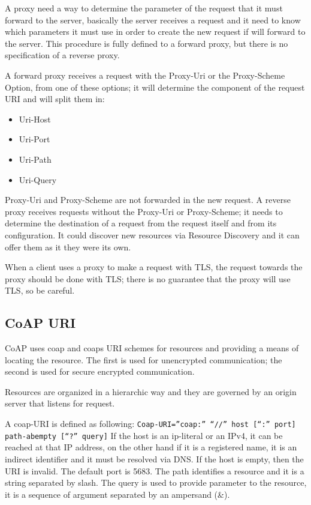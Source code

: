 	A proxy need a way to determine the parameter of the request that it must forward to the server, basically the server receives a request and it need to know which parameters it must use in order to create the new request if will forward to the server.
	This procedure is fully defined to a forward proxy, but there is no specification of a reverse proxy.
	
	A forward proxy receives a request with the Proxy-Uri or the Proxy-Scheme Option, from one of these options; it will determine the component of the request URI and will split them in:
	\begin{itemize}
		\item Uri-Host
		\item Uri-Port
		\item Uri-Path
		\item Uri-Query
	\end{itemize}

	Proxy-Uri and Proxy-Scheme are not forwarded in the new request.\newline
	A reverse proxy receives requests without the Proxy-Uri or Proxy-Scheme; it needs to determine the destination of a request from the request itself and from its configuration.
	It could discover new resources via Resource Discovery and it can offer them as it they were its own.
	
	When a client uses a proxy to make a request with TLS, the request towards the proxy should be done with TLS; there is no guarantee that the proxy will use TLS, so be careful.
	
	\subsection{CoAP URI}
	CoAP uses coap and coaps URI schemes for resources and providing a means of locating the resource.
	The first is used for unencrypted communication; the second is used for secure encrypted communication.
	
	Resources are organized in a hierarchic way and they are governed by an origin server that listens for request.
	
	A coap-URI is defined as following:
	\texttt{Coap-URI=”coap:” “//” host [“:” port] path-abempty [“?” query]}
	If the host is an ip-literal or an IPv4, it can be reached at that IP address, on the other hand if it is a registered name, it is an indirect identifier and it must be resolved via DNS.\newline
	If the host is empty, then the URI is invalid.\newline
	The default port is 5683.\newline
	The path identifies a resource and it is a string separated by slash.\newline
	The query is used to provide parameter to the resource, it is a sequence of argument separated by an ampersand (\&).
	
